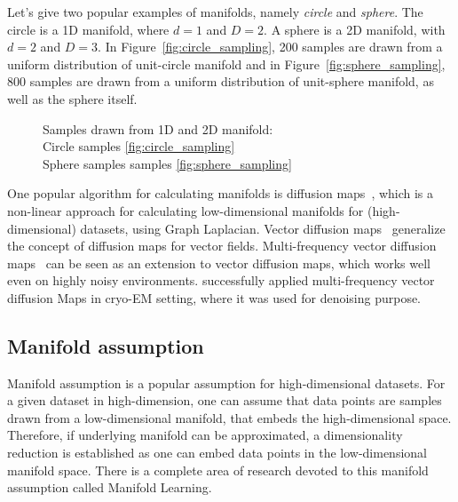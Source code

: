 Let's give two popular examples of manifolds, namely \textit{circle} and \textit{sphere}.
The circle is a 1D manifold, where $d=1$ and $D=2$. A sphere is a 2D manifold, with $d=2$ and $D=3$.
In Figure~\ref{fig:circle_sampling}, 200 samples are drawn from a uniform distribution of unit-circle manifold
and in Figure~\ref{fig:sphere_sampling}, 800 samples are drawn from a uniform distribution of unit-sphere manifold,
as well as the sphere itself.

\begin{figure}[H]
    \hfill
    \hfill
    \hfill
        \caption{Samples drawn from 1D and 2D manifold: \\
    Circle samples \ref{fig:circle_sampling} \\
    Sphere samples samples \ref{fig:sphere_sampling}}
\end{figure}

One popular algorithm for calculating manifolds is diffusion maps~\cite{diffusionMaps}, 
which is a non-linear approach for calculating low-dimensional manifolds
for (high-dimensional) datasets, using Graph Laplacian.
Vector diffusion maps~\cite{vectorDiffusionMaps} generalize the concept of diffusion maps for vector fields.
Multi-frequency vector diffusion maps~\cite{multiDiffusionMaps} 
can be seen as an extension to vector diffusion maps, which works well even on highly noisy environments.
\citet{cryoEmMutliDM} successfully applied multi-frequency vector diffusion Maps in cryo-EM setting,
 where it was used for denoising purpose.

\subsection{Manifold assumption}
\label{sec:manifoldAssumption}
Manifold assumption is a popular assumption for high-dimensional datasets.
For a given dataset in high-dimension, one can assume that data points are samples drawn from a low-dimensional manifold,
that embeds the high-dimensional space. 
Therefore, if underlying manifold can be approximated, a dimensionality reduction
is established as one can embed data points in the low-dimensional manifold space.
There is a complete area of research devoted to this manifold assumption called Manifold Learning\cite{ManifoldLearning}.

